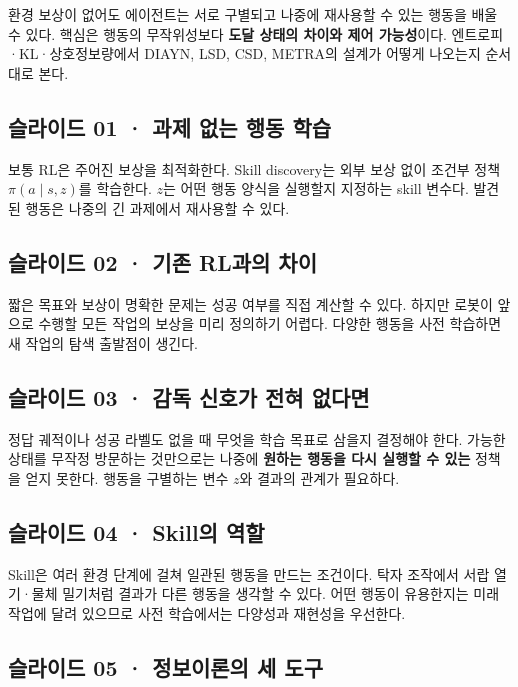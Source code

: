 \documentclass[11pt,a4paper]{article}
\begin{document}
환경 보상이 없어도 에이전트는 서로 구별되고 나중에 재사용할 수 있는 행동을 배울 수 있다. 핵심은 행동의 무작위성보다 \textbf{도달 상태의 차이와 제어 가능성}이다. 엔트로피·KL·상호정보량에서 DIAYN, LSD, CSD, METRA의 설계가 어떻게 나오는지 순서대로 본다.\par

\subsection{슬라이드 01 · 과제 없는 행동 학습}

보통 RL은 주어진 보상을 최적화한다. Skill discovery는 외부 보상 없이 조건부 정책 $\pi(a\mid s,z)$를 학습한다. $z$는 어떤 행동 양식을 실행할지 지정하는 skill 변수다. 발견된 행동은 나중의 긴 과제에서 재사용할 수 있다.\par

\subsection{슬라이드 02 · 기존 RL과의 차이}

짧은 목표와 보상이 명확한 문제는 성공 여부를 직접 계산할 수 있다. 하지만 로봇이 앞으로 수행할 모든 작업의 보상을 미리 정의하기 어렵다. 다양한 행동을 사전 학습하면 새 작업의 탐색 출발점이 생긴다.\par

\subsection{슬라이드 03 · 감독 신호가 전혀 없다면}

정답 궤적이나 성공 라벨도 없을 때 무엇을 학습 목표로 삼을지 결정해야 한다. 가능한 상태를 무작정 방문하는 것만으로는 나중에 \textbf{원하는 행동을 다시 실행할 수 있는} 정책을 얻지 못한다. 행동을 구별하는 변수 $z$와 결과의 관계가 필요하다.\par

\subsection{슬라이드 04 · Skill의 역할}

Skill은 여러 환경 단계에 걸쳐 일관된 행동을 만드는 조건이다. 탁자 조작에서 서랍 열기·물체 밀기처럼 결과가 다른 행동을 생각할 수 있다. 어떤 행동이 유용한지는 미래 작업에 달려 있으므로 사전 학습에서는 다양성과 재현성을 우선한다.\par

\subsection{슬라이드 05 · 정보이론의 세 도구}
\end{document}
